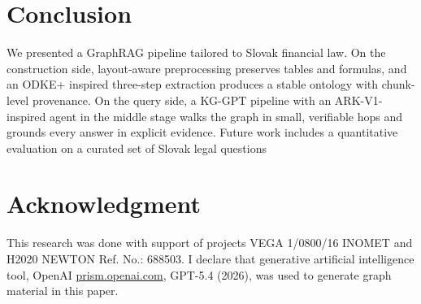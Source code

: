 \documentclass[conference]{IEEEtran}
\begin{document}
\section{Conclusion}

We presented a GraphRAG pipeline tailored to Slovak financial law. On the construction side, layout-aware preprocessing preserves tables and formulas, and an ODKE+ inspired three-step extraction produces a stable ontology with chunk-level provenance. On the query side, a KG-GPT pipeline with an ARK-V1-inspired agent in the middle stage walks the graph in small, verifiable hops and grounds every answer in explicit evidence. Future work includes a quantitative evaluation on a curated set of Slovak legal questions


\section*{Acknowledgment}

This research was done with support of projects VEGA 1/0800/16 INOMET and H2020 NEWTON Ref. No.: 688503. I declare that generative artificial intelligence tool, OpenAI \url{prism.openai.com}, GPT-5.4 (2026), was used to generate graph material in this paper. 
\end{document}
